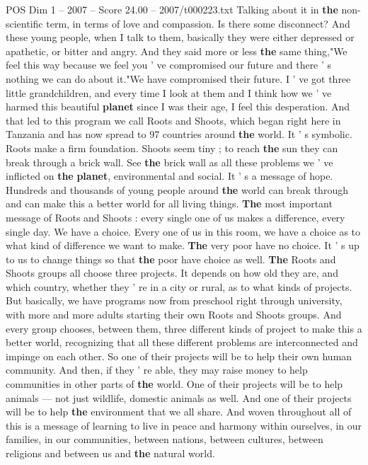 \begin{textsample}{POS Dim 1 – 2007 – Score 24.00 – 2007/t000223.txt}
Talking about it in \textbf{the} non-scientific term, in terms of love and compassion.
Is there some disconnect?
And these young people, when I talk to them, basically they were either depressed or apathetic, or bitter and angry.
And they said more or less \textbf{the} same thing,"We feel this way because we feel you ' ve compromised our future and there ' s nothing we can do about it."We have compromised their future.
I ' ve got three little grandchildren, and every time I look at them and I think how we ' ve harmed this beautiful \textbf{planet} since I was their age, I feel this desperation.
And that led to this program we call Roots and Shoots, which began right here in Tanzania and has now spread to 97 countries around \textbf{the} world.
It ' s symbolic.
Roots make a firm foundation.
Shoots seem tiny ; to reach \textbf{the} sun they can break through a brick wall.
See \textbf{the} brick wall as all these problems we ' ve inflicted on \textbf{the} \textbf{planet}, environmental and social.
It ' s a message of hope.
Hundreds and thousands of young people around \textbf{the} world can break through and can make this a better world for all living things. \textbf{The} most important message of Roots and Shoots : every single one of us makes a difference, every single day.
We have a choice.
Every one of us in this room, we have a choice as to what kind of difference we want to make. \textbf{The} very poor have no choice.
It ' s up to us to change things so that \textbf{the} poor have choice as well. \textbf{The} Roots and Shoots groups all choose three projects.
It depends on how old they are, and which country, whether they ' re in a city or rural, as to what kinds of projects.
But basically, we have programs now from preschool right through university, with more and more adults starting their own Roots and Shoots groups.
And every group chooses, between them, three different kinds of project to make this a better world, recognizing that all these different problems are interconnected and impinge on each other.
So one of their projects will be to help their own human community.
And then, if they ' re able, they may raise money to help communities in other parts of \textbf{the} world.
One of their projects will be to help animals — not just wildlife, domestic animals as well.
And one of their projects will be to help \textbf{the} environment that we all share.
And woven throughout all of this is a message of learning to live in peace and harmony within ourselves, in our families, in our communities, between nations, between cultures, between religions and between us and \textbf{the} natural world.

\end{textsample}
